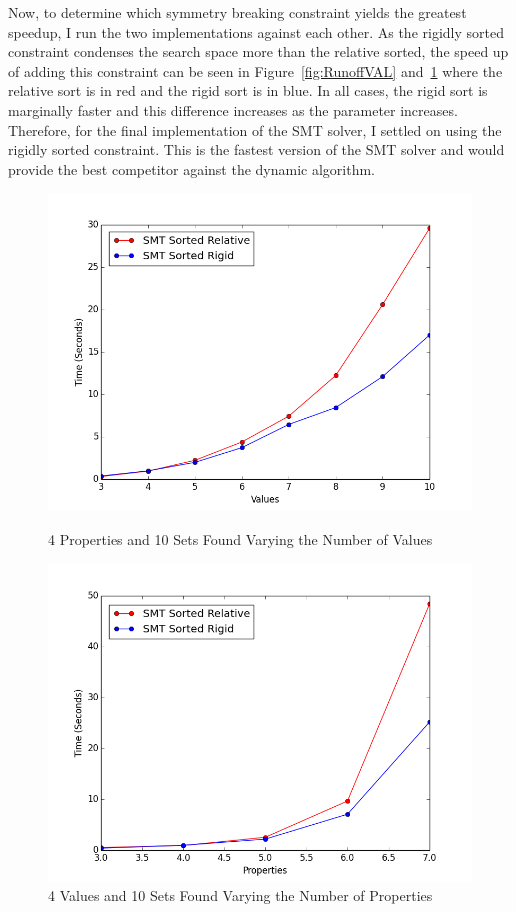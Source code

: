 \documentclass[pageno]{jpaper}
\begin{document}




Now, to determine which symmetry breaking constraint yields the greatest speedup, I run the two implementations against each other. As the rigidly sorted constraint condenses the search space more than the relative sorted, the speed up of adding this constraint can be seen in Figure~\ref{fig:RunoffVAL} and~\ref{fig:RunoffPROP} where the relative sort is in red and the rigid sort is in blue. In all cases, the rigid sort is marginally faster and this difference increases as the parameter increases. Therefore, for the final implementation of the SMT solver, I settled on using the rigidly sorted constraint. This is the fastest version of the SMT solver and would provide the best competitor against the dynamic algorithm.



\begin{figure}[htbb]
\begin{minipage}[b]{0.5\linewidth}
\centering
\includegraphics[width=.75\linewidth]{RunoffSMTVAL-v345678910p4n10.png}
\caption{4 Properties and 10 Sets Found Varying the Number of Values}
\label{fig:RunoffVAL}
\end{minipage}
\hspace{0.5cm}
\begin{minipage}[b]{0.5\linewidth}
\centering
\includegraphics[width=.75\linewidth]{RunoffSMTPROP-v4p34567n10.png}
\caption{4 Values and 10 Sets Found Varying the Number of Properties}
\label{fig:RunoffPROP}
\end{minipage}
\end{figure}
\end{document}
